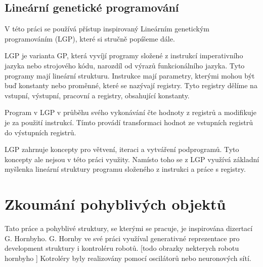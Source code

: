 \section{Lineární genetické programování}
V této práci se používá přístup inspirovaný Lineárním genetickým programováním (LGP), které si stručně popíšeme dále.

LGP je varianta GP, která vyvíjí programy složené z instrukcí imperativního jazyka nebo strojového kódu, narozdíl od výrazů funkcionálního jazyka.
Tyto programy mají lineární strukturu.
Instrukce mají parametry, kterými mohou být buď konstanty nebo proměnné, které se nazývají registry.
Tyto registry dělíme na vstupní, výstupní, pracovní a registry, obsahující konstanty.

Program v LGP v průběhu svého vykonávání čte hodnoty z registrů a modifikuje je za použití instrukcí.
Tímto provádí transformaci hodnot ze vstupních registrů do výstupních registrů.

LGP zahrnuje koncepty pro větvení, iteraci a vytváření podprogramů.
Tyto koncepty ale nejsou v této práci využity.
Namísto toho se z LGP využívá základní myšlenka lineární struktury programu složeného z instrukci a práce s registry.



\chapter{Zkoumání pohyblivých objektů}



Tato práce a pohyblivé struktury, se kterými se pracuje, je inspirována dizertací G. Hornbyho.
G. Hornby ve své práci využíval generativné reprezentace pro development struktury i kontroléru robotů.
[todo obrazky nekterych robotu hornbyho ]
Kotroléry byly realizovány pomocí oscilátorů nebo neuronových sítí.

